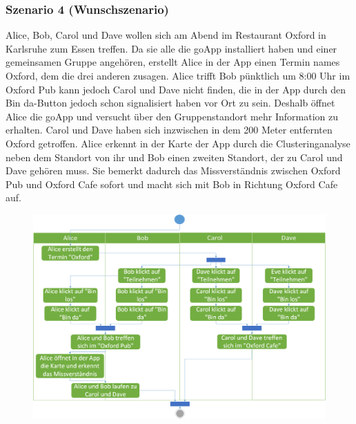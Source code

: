 \documentclass{scrartcl}
\begin{document}
	\subsubsection{Szenario 4 (Wunschszenario)}
	Alice, Bob, Carol und Dave wollen sich am Abend im Restaurant \glqq{}Oxford\grqq{} in Karlsruhe zum Essen treffen. 
	Da sie alle die goApp installiert haben und einer gemeinsamen Gruppe angehören, erstellt Alice in der App 		einen Termin names \glqq{}Oxford\grqq{}, dem die drei anderen zusagen. Alice trifft Bob pünktlich um 8:00 Uhr im 		\glqq{}Oxford Pub\grqq{} kann jedoch Carol und Dave nicht finden, die in der App durch den \glqq{}Bin da\grqq{}-Button 		jedoch schon signalisiert haben vor Ort zu sein. Deshalb öffnet Alice die goApp und versucht über den Gruppenstandort 		mehr Information zu erhalten. Carol und Dave haben sich inzwischen in dem 200 Meter entfernten \glqq{}Oxford 			\grqq{} getroffen. Alice erkennt in der Karte der App durch die Clusteringanalyse neben dem Standort von ihr und 		Bob einen zweiten Standort, der zu Carol und Dave gehören muss. Sie bemerkt dadurch das Missverständnis zwischen 		\glqq{}Oxford Pub\grqq{} und \glqq{}Oxford Cafe\grqq{} sofort und macht sich mit Bob in Richtung \glqq{}Oxford 			Cafe\grqq{} auf.    	
	\begin{figure}[h]
		\includegraphics[width=\textwidth]{Szenario4}
	\end{figure}
	
	
	
	\newpage
	
\end{document}
